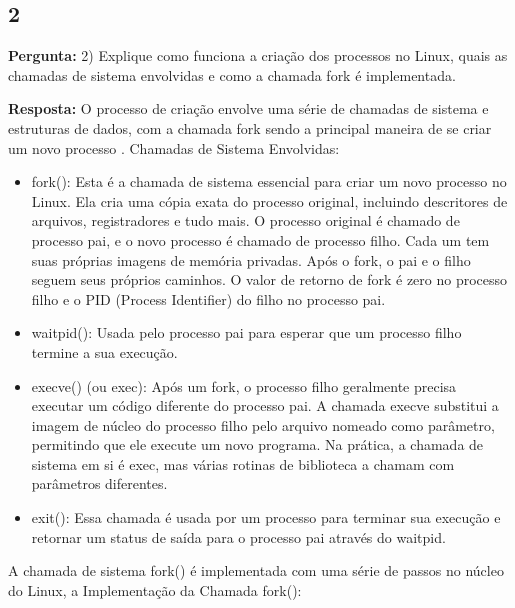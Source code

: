 \documentclass{article}
\begin{document}
\subsection{2}

\textbf{Pergunta:} 2) Explique como funciona a criação dos processos no Linux, quais as chamadas de sistema envolvidas e como a chamada fork é implementada.\newline

\textbf{Resposta:}  O processo de criação envolve uma série de chamadas de sistema e estruturas de dados, com a chamada fork sendo a principal maneira de se criar um novo processo \parencite[p. 37]{tanenbaum2021}. Chamadas de Sistema Envolvidas:

\begin{itemize}
  \item fork(): Esta é a chamada de sistema essencial para criar um novo processo no Linux. Ela cria uma cópia exata do processo original, incluindo descritores de arquivos, registradores e tudo mais. O processo original é chamado de processo pai, e o novo processo é chamado de processo filho. Cada um tem suas próprias imagens de memória privadas. Após o fork, o pai e o filho seguem seus próprios caminhos. O valor de retorno de fork é zero no processo filho e o PID (Process Identifier) do filho no processo pai.
  \item waitpid(): Usada pelo processo pai para esperar que um processo filho termine a sua execução. 
  \item execve() (ou exec): Após um fork, o processo filho geralmente precisa executar um código diferente do processo pai. A chamada execve substitui a imagem de núcleo do processo filho pelo arquivo nomeado como parâmetro, permitindo que ele execute um novo programa. Na prática, a chamada de sistema em si é exec, mas várias rotinas de biblioteca a chamam com parâmetros diferentes.
  \item exit(): Essa chamada é usada por um processo para terminar sua execução e retornar um status de saída para o processo pai através do waitpid.
\end{itemize}

A chamada de sistema fork() é implementada com uma série de passos no núcleo do Linux, a Implementação da Chamada fork():
\end{document}

